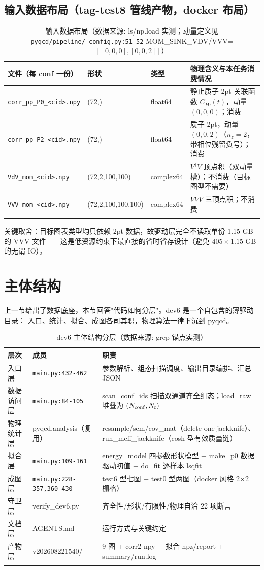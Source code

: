 \documentclass[UTF8]{ctexart}
\begin{document}
\subsection{输入数据布局（tag-test8 管线产物，docker 布局）}
\begin{xltabular}{\textwidth}{lllX}
\toprule
文件（每 conf 一份） & 形状 & 类型 & 物理含义与本任务消费情况 \\
\midrule
\endhead
\texttt{\nolinkurl{corr_pp_P0_<cid>.npy}} & (72,) & float64 & 静止质子 2pt 关联函数 $C_{P0}(t)$，动量 $(0,0,0)$；消费 \\
\texttt{\nolinkurl{corr_pp_P2_<cid>.npy}} & (72,) & float64 & 质子 2pt，动量 $(0,0,2)$（$n_z{=}2$，带相位残留负号）；消费 \\
\texttt{\nolinkurl{VdV_mom_<cid>.npy}} & (72,2,100,100) & complex64 & $V^\dagger V$ 顶点积（双动量槽）；不消费（目标图型不需要）\\
\texttt{\nolinkurl{VVV_mom_<cid>.npy}} & (72,2,100,100,100) & complex64 & $VVV$ 三顶点积；不消费 \\
\bottomrule
\caption{输入数据布局（数据来源: ls/np.load 实测；动量定义见
\texttt{\nolinkurl{pyqcd/pipeline/_config.py:51-52}} MOM\_SINK\_VDV/VVV=$[[0,0,0],[0,0,2]]$）}
\end{xltabular}

关键取舍：目标图表类型均只依赖 2pt 数据，故驱动层完全不读取单份 1.15 GB 的
VVV 文件——这是低资源约束下最直接的省时省存设计（避免 $405\times1.15$ GB 的无谓 IO）。

\section{主体结构}
上一节给出了数据底座，本节回答"代码如何分层"。dev6 是一个自包含的薄驱动目录：
入口、统计、拟合、成图各司其职，物理算法一律下沉到 pyqcd。
\begin{xltabular}{\textwidth}{llX}
\toprule
\textcolor{struct}{层次} & 成员 & 职责 \\
\midrule
\endhead
入口层 & \texttt{\nolinkurl{main.py:432-462}} & 参数解析、组态扫描调度、输出目录编排、汇总 JSON \\
数据访问层 & \texttt{\nolinkurl{main.py:84-105}} & scan\_conf\_ids 扫描双通道齐全组态；load\_raw 堆叠为 $(N_{\rm conf},N_t)$ \\
物理统计层 & pyqcd.analysis（复用） & resample/sem/cov\_mat（delete-one jackknife）、run\_meff\_jackknife（cosh 型有效质量链）\\
拟合层 & \texttt{\nolinkurl{main.py:109-161}} & energy\_model 四参数形状模型 + make\_p0 数据驱动初值 + do\_fit 逐样本 lsqfit \\
成图层 & \texttt{\nolinkurl{main.py:228-357,360-430}} & test6 型七图 + test0 型两图（docker 风格 2$\times$2 栅格）\\
守卫层 & verify\_dev6.py & 齐全性/形状/有限性/物理自洽 22 项断言 \\
文档层 & AGENTS.md & 运行方式与关键约定 \\
产物层 & v202608221540/ & 9 图 + corr2 npy + 拟合 npz/report + summary/run.log \\
\bottomrule
\caption{dev6 主体结构分层（数据来源: grep 锚点实测）}
\end{xltabular}
\end{document}
